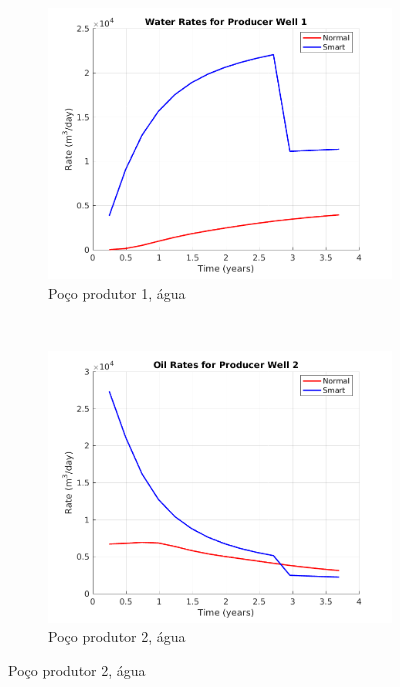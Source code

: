 \begin{figure}[!ht]
	\centering
	\begin{subfigure}[b]{.3\textwidth}
		\includegraphics[width=\textwidth]{figs/resultadosSSAIGUP/SSAIGUP_WaterWell1_Zoom}
		\caption{Po\c{c}o produtor 1, \'{a}gua}
		\label{SSAIGUP_WaterWell1}
	\end{subfigure}
	~
	\begin{subfigure}[b]{.3\textwidth}
		\includegraphics[width=\textwidth]{figs/resultadosSSAIGUP/SSAIGUP_OilWell2_Zoom}
		\caption{Po\c{c}o produtor 2, \'{a}gua}
		\label{SSAIGUP_WaterWell2}
	\end{subfigure}

\end{figure}
